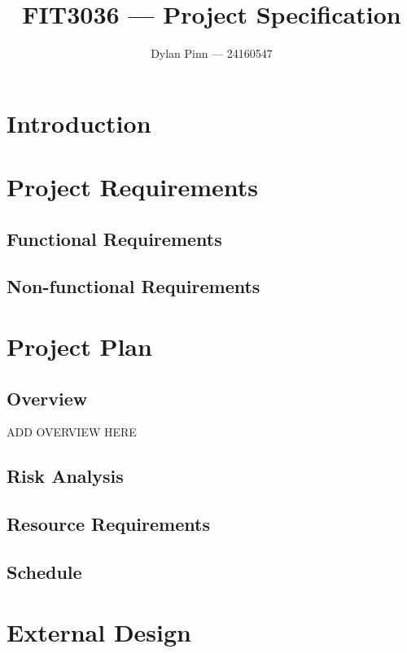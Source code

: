 \documentclass[a4paper,11pt]{article}
\begin{document}
\title{FIT3036 --- Project Specification}
\author{Dylan Pinn --- 24160547}
\maketitle
\pagebreak

\tableofcontents
\pagebreak

\section{Introduction}

\section{Project Requirements}

  \subsection{Functional Requirements}

  \subsection{Non-functional Requirements}

\section{Project Plan}

  \subsection{Overview}

  ADD OVERVIEW HERE

  \subsection{Risk Analysis}

  \subsection{Resource Requirements}

  \subsection{Schedule}

\section{External Design}
\end{document}

